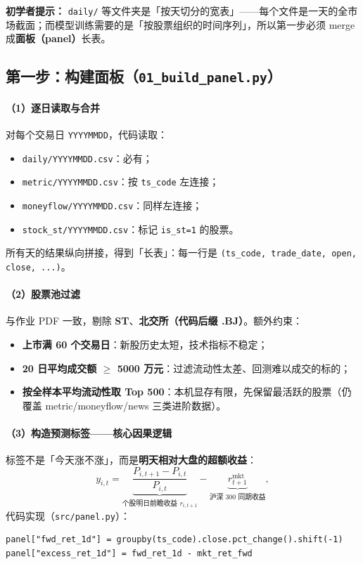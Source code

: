 \documentclass[UTF8,a4paper,12pt]{ctexart}
\begin{document}
\textbf{初学者提示：} \texttt{daily/} 等文件夹是「按天切分的宽表」——每个文件是一天的全市场截面；而模型训练需要的是「按股票组织的时间序列」，所以第一步必须 merge 成\textbf{面板（panel）}长表。

\subsection{第一步：构建面板（\texttt{01\_build\_panel.py}）}

\paragraph{（1）逐日读取与合并}

对每个交易日 \texttt{YYYYMMDD}，代码读取：
\begin{itemize}[leftmargin=2em]
  \item \texttt{daily/YYYYMMDD.csv}：必有；
  \item \texttt{metric/YYYYMMDD.csv}：按 \texttt{ts\_code} 左连接；
  \item \texttt{moneyflow/YYYYMMDD.csv}：同样左连接；
  \item \texttt{stock\_st/YYYYMMDD.csv}：标记 \texttt{is\_st=1} 的股票。
\end{itemize}
所有天的结果纵向拼接，得到「长表」：每一行是 \texttt{(ts\_code, trade\_date, open, close, ...)}。

\paragraph{（2）股票池过滤}

与作业 PDF 一致，剔除 \textbf{ST}、\textbf{北交所（代码后缀 .BJ）}。额外约束：
\begin{itemize}[leftmargin=2em]
  \item \textbf{上市满 60 个交易日}：新股历史太短，技术指标不稳定；
  \item \textbf{20 日平均成交额 $\geq$ 5000 万元}：过滤流动性太差、回测难以成交的标的；
  \item \textbf{按全样本平均流动性取 Top 500}：本机显存有限，先保留最活跃的股票（仍覆盖 metric/moneyflow/news 三类进阶数据）。
\end{itemize}

\paragraph{（3）构造预测标签——核心因果逻辑}

标签不是「今天涨不涨」，而是\textbf{明天相对大盘的超额收益}：
\begin{equation}
  y_{i,t} = \underbrace{\frac{P_{i,t+1}-P_{i,t}}{P_{i,t}}}_{\text{个股明日前瞻收益 } r_{i,t+1}}
  - \underbrace{r^{\mathrm{mkt}}_{t+1}}_{\text{沪深 300 同期收益}},
\end{equation}
代码实现（\texttt{src/panel.py}）：
\begin{verbatim}
panel["fwd_ret_1d"] = groupby(ts_code).close.pct_change().shift(-1)
panel["excess_ret_1d"] = fwd_ret_1d - mkt_ret_fwd
\end{verbatim}
\end{document}
